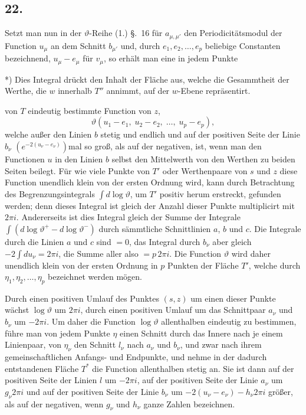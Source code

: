 \documentclass{article}
\begin{document}
\subsection*{22.}

Setzt man nun in der $\vartheta$-Reihe (1.) §.~16 für $a_{\mu,\mu'}$ den Periodicitätsmodul der Function $u_{\mu}$ an dem Schnitt $b_{\mu'}$ und, durch $e_{1}, e_{2}, \ldots, e_{p}$ beliebige Constanten bezeichnend, $u_{\mu} - e_{\mu}$ für $v_{\mu}$, so erhält man eine in jedem Punkte

*) Dies Integral drückt den Inhalt der Fläche aus, welche die Gesammtheit der Werthe, die $w$ innerhalb $T''$ annimmt, auf der $w$-Ebene repräsentirt.

von $T$ eindeutig bestimmte Function von $z$,
\[ \vartheta(u_{1}-e_{1}, \; u_{2}-e_{2}, \; \ldots, \; u_{p}-e_{p}), \]
welche außer den Linien $b$ stetig und endlich und auf der positiven Seite der Linie $b_{\nu}$ $\left(e^{-2(u_{\nu}-e_{\nu})}\right)$mal so groß, als auf der negativen, ist, wenn man den Functionen $u$ in den Linien $b$ selbst den Mittelwerth von den Werthen zu beiden Seiten beilegt. Für wie viele Punkte von $T'$ oder Werthenpaare von $s$ und $z$ diese Function unendlich klein von der ersten Ordnung wird, kann durch Betrachtung des Begrenzungsintegrals $\displaystyle\int d\log\vartheta$, um $T'$ positiv herum erstreckt, gefunden werden; denn dieses Integral ist gleich der Anzahl dieser Punkte multiplicirt mit $2\pi i$. Andererseits ist dies Integral gleich der Summe der Integrale $\displaystyle\int (d\log\vartheta^{+} - d\log\vartheta^{-})$ durch sämmtliche Schnittlinien $a$, $b$ und $c$. Die Integrale durch die Linien $a$ und $c$ sind $= 0$, das Integral durch $b_{\nu}$ aber gleich $-2\displaystyle\int du_{\nu} = 2\pi i$, die Summe aller also $= p\,2\pi i$. Die Function $\vartheta$ wird daher unendlich klein von der ersten Ordnung in $p$ Punkten der Fläche $T'$, welche durch $\eta_{1}, \eta_{2}, \ldots, \eta_{p}$ bezeichnet werden mögen.

Durch einen positiven Umlauf des Punktes $(s, z)$ um einen dieser Punkte wächst $\log\vartheta$ um $2\pi i$, durch einen positiven Umlauf um das Schnittpaar $a_{\nu}$ und $b_{\nu}$ um $-2\pi i$. Um daher die Function $\log\vartheta$ allenthalben eindeutig zu bestimmen, führe man von jedem Punkte $\eta$ einen Schnitt durch das Innere nach je einem Linienpaar, von $\eta_{\nu}$ den Schnitt $l_{\nu}$ nach $a_{\nu}$ und $b_{\nu}$, und zwar nach ihrem gemeinschaftlichen Anfangs- und Endpunkte, und nehme in der dadurch entstandenen Fläche $T^{*}$ die Function allenthalben stetig an. Sie ist dann auf der positiven Seite der Linien $l$ um $-2\pi i$, auf der positiven Seite der Linie $a_{\nu}$ um $g_{\nu} 2\pi i$ und auf der positiven Seite der Linie $b_{\nu}$ um $-2(u_{\nu}-e_{\nu}) - h_{\nu} 2\pi i$ größer, als auf der negativen, wenn $g_{\nu}$ und $h_{\nu}$ ganze Zahlen bezeichnen.
\end{document}
